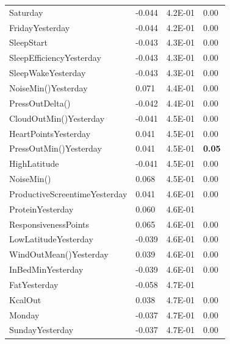 \documentclass[conference]{IEEEtran}
\begin{document}
\begin{table}[]
\begin{tabular}{llll}
Saturday                       & -0.044 & 4.2E-01          & 0.00           \\
FridayYesterday                & -0.044 & 4.2E-01          & 0.00           \\
SleepStart                     & -0.043 & 4.3E-01          & 0.00           \\
SleepEfficiencyYesterday       & -0.043 & 4.3E-01          & 0.00           \\
SleepWakeYesterday             & -0.043 & 4.3E-01          & 0.00           \\
NoiseMin()Yesterday            & 0.071  & 4.4E-01          & 0.00           \\
PressOutDelta()                & -0.042 & 4.4E-01          & 0.00           \\
CloudOutMin()Yesterday         & -0.041 & 4.5E-01          & 0.00           \\
HeartPointsYesterday           & 0.041  & 4.5E-01          & 0.00           \\
PressOutMin()Yesterday         & 0.041  & 4.5E-01          & \textbf{0.05}  \\
HighLatitude                   & -0.041 & 4.5E-01          & 0.00           \\
NoiseMin()                     & 0.068  & 4.5E-01          & 0.00           \\
ProductiveScreentimeYesterday  & 0.041  & 4.6E-01          & 0.00           \\
ProteinYesterday               & 0.060  & 4.6E-01          &                \\
ResponsivenessPoints           & 0.065  & 4.6E-01          & 0.00           \\
LowLatitudeYesterday           & -0.039 & 4.6E-01          & 0.00           \\
WindOutMean()Yesterday         & 0.039  & 4.6E-01          & 0.00           \\
InBedMinYesterday              & -0.039 & 4.6E-01          & 0.00           \\
FatYesterday                   & -0.058 & 4.7E-01          &                \\
KcalOut                        & 0.038  & 4.7E-01          & 0.00           \\
Monday                         & -0.037 & 4.7E-01          & 0.00           \\
SundayYesterday                & -0.037 & 4.7E-01          & 0.00           \\

\end{tabular}
\end{table}
\end{document}
